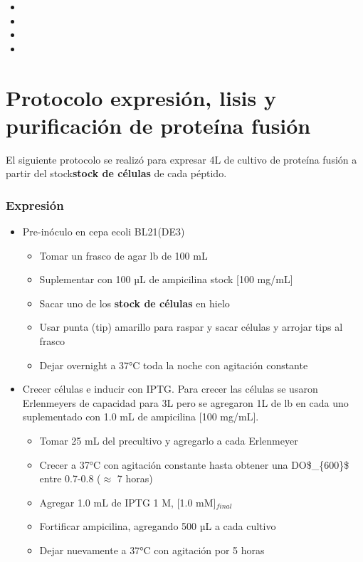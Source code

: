 \begin{appendix}
\begin{itemize}
     \begin{itemize}
        \item{}
        \item{}
        \item{}
        \item{}
    \end{itemize}
\end{itemize}

\chapter{Protocolo expresión, lisis y purificación de proteína fusión}\label{Protocolo_Fusion}
El siguiente protocolo se realizó para expresar 4L de cultivo de proteína fusión a partir del stock\textbf{stock de células} de cada péptido.

\subsection{Expresión}

\begin{itemize}
    \item{Pre-inóculo en cepa \ac{ecoli} BL21(DE3)}
    \begin{itemize}
        \item{Tomar un frasco de agar \ac{lb} de 100 mL}
        \item{Suplementar con 100 µL de ampicilina stock [100 mg/mL]}
        \item{Sacar uno de los \textbf{stock de células} en hielo}
        \item{Usar punta (tip) amarillo para raspar y sacar células y arrojar tips al frasco}
        \item{Dejar overnight a 37°C toda la noche con agitación constante}
    \end{itemize}

    \item{Crecer células e inducir con IPTG}.
    Para crecer las células se usaron Erlenmeyers de capacidad para 3L pero se agregaron 1L de \ac{lb} en cada uno suplementado con 1.0 mL de ampicilina [100 mg/mL].
    \begin{itemize}
        \item{Tomar 25 mL del precultivo y agregarlo a cada Erlenmeyer}
        \item{Crecer a 37°C con agitación constante hasta obtener una \ac{DO$_{600}$} entre 0.7-0.8 ($\approx$ 7 horas)}
        \item{Agregar 1.0 mL de IPTG 1 M, [1.0 mM]$_{final}$}
        \item{Fortificar ampicilina, agregando 500 µL a cada cultivo}
        \item{Dejar nuevamente a 37°C con agitación por 5 horas}
    \end{itemize}


\end{itemize}
\end{appendix}
